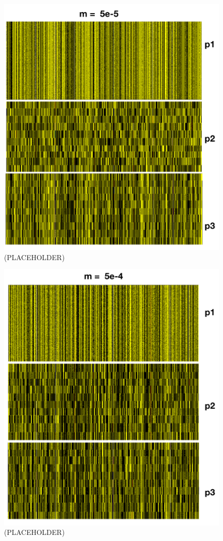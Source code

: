 \documentclass{article}
\begin{document}
\begin{figure}[h!tb]
	\begin{center}
  		\includegraphics[width=0.7\linewidth]{plotlyPlots/Haplo5e-5.png}
  		\caption{ (PLACEHOLDER)
		}
  		\label{fig:Haplo1}
	\end{center}
\end{figure}

\begin{figure}[h!tb]
	\begin{center}
  		\includegraphics[width=0.7\linewidth]{plotlyPlots/Haplo5e-4.png}
  		\caption{(PLACEHOLDER)
		}
  		\label{fig:Haplo2}
	\end{center}
\end{figure}
\end{document}
